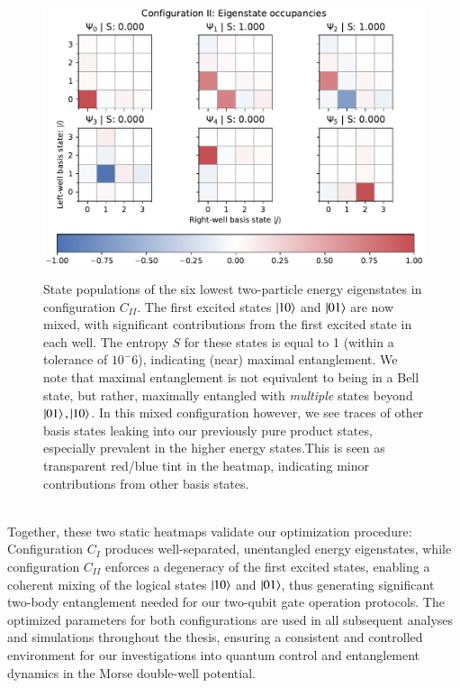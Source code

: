 \documentclass{subfiles}
\begin{document}
\begin{figure}[h!]
    \centering
    \includegraphics[width=1.0\textwidth]{figs/state_populations_II.pdf}
    \label{fig:state_populations_II}
    \caption{State populations of the six lowest two-particle energy eigenstates in configuration $C_{II}$. The first excited states $\ket{10}$ and $\ket{01}$ are now mixed, with significant contributions from the first excited state in each well. The entropy $S$ for these states is equal to 1 (within a tolerance of $10^-6$), indicating (near) maximal entanglement. We note that maximal entanglement is not equivalent to being in a Bell state, but rather, maximally entangled with \emph{multiple} states beyond $\ket{01}, \ket{10}$. In this mixed configuration however, we see traces of other basis states leaking into our previously pure product states, especially prevalent in the higher energy states.This is seen as transparent red/blue tint in the heatmap, indicating minor contributions from other basis states.}
\end{figure}
\\

Together, these two static heatmaps validate our optimization procedure: Configuration $C_I$ produces well-separated, unentangled energy eigenstates, while configuration $C_{II}$ enforces a degeneracy of the first excited states, enabling a coherent mixing of the logical states $\ket{10}$ and $\ket{01}$, thus generating significant two-body entanglement needed for our two-qubit gate operation protocols. The optimized parameters for both configurations are used in all subsequent analyses and simulations throughout the thesis, ensuring a consistent and controlled environment for our investigations into quantum control and entanglement dynamics in the Morse double-well potential.
\end{document}
